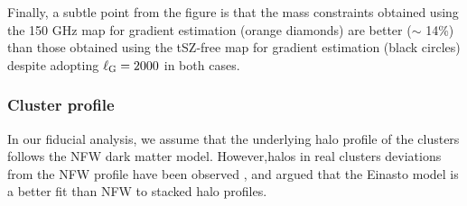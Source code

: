 Finally, a subtle point from the figure is that the mass constraints obtained using the 150 GHz map for gradient estimation
(orange diamonds) are better ($\sim$ 14\%) than those obtained using the tSZ-free map for gradient estimation (black circles) despite adopting $\ell_{\rm G} = 2000$ in both cases.
 \subsubsection{Cluster profile}\label{subsec_clusprofile}
In our fiducial analysis, we assume that the underlying halo profile of the clusters follows the NFW dark matter model. 
However,halos in real clusters %
deviations from the NFW profile have been observed \citep[e.g.,][]{diemer14}, and 
\citet{child18} argued that the Einasto model is a better fit than NFW to stacked halo profiles.

